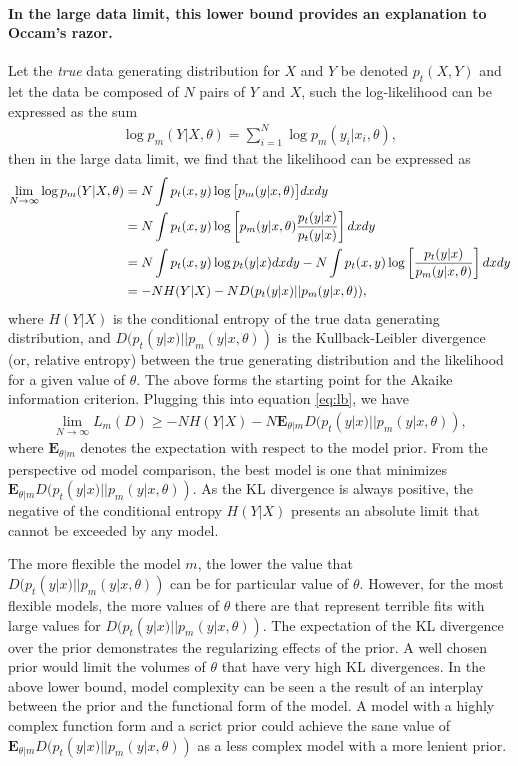 \documentclass[10pt,a4paper]{article}
\begin{document}
\paragraph{In the large data limit, this lower bound provides an explanation to Occam's razor.} Let the \emph{true} data generating distribution for $X$ and $Y$ be denoted $p_t(X,Y)$ and let the data be composed of $N$ pairs of $Y$ and $X$, such the log-likelihood can be expressed as the sum
\begin{align}
\log p_m(Y|X,\theta)=  \sum^N_{i=1} \log p_m(y_i|x_i,\theta),
\end{align}
then in the large data limit, we find that the likelihood can be expressed as
\begin{align}
\lim_{N \rightarrow \infty} \log p_m(Y|X,\theta) &= N \int p_t(x, y)  \log \big[p_m(y|x,\theta) \big]dx dy \notag\\
&=N \int p_t(x, y)  \log \left[ p_m(y|x,\theta) \frac{p_t(y|x)}{p_t(y|x)} \right] dx dy  \notag\\
&= N  \int p_t(x, y)  \log p_t(y|x) dx dy -N  \int p_t(x, y)  \log \left[  \frac{p_t(y|x)}{p_m(y|x,\theta)} \right] dx dy \notag\\
&= -N H(Y|X) - N D(p_t(y|x) || p_m(y|x,\theta)) ,
\label{eq:asym_like}
\end{align}
where $H(Y|X)$ is the conditional entropy of the true data generating distribution, and $D(p_t(y|x) || p_m(y|x,\theta))$ is the Kullback-Leibler divergence (or, relative entropy) between the true generating distribution and the likelihood for a given value of $\theta$. The above forms the starting point for the Akaike information criterion. Plugging this into equation \ref{eq:lb}, we have
\begin{align}
\lim_{N \rightarrow \infty} L_m(D)  \geq -N H(Y|X) - N \mathbf{E}_{\theta|m} D(p_t(y|x) || p_m(y|x,\theta)),
\end{align}
where $ \mathbf{E}_{\theta|m}$ denotes the expectation with respect to the model prior. From the perspective od model comparison, the best model is one that minimizes $ \mathbf{E}_{\theta|m} D(p_t(y|x) || p_m(y|x,\theta))$. As the KL divergence is always positive, the negative of the conditional entropy $H(Y|X)$ presents an absolute limit that cannot be exceeded by any model. 

The more flexible the model $m$, the lower the value that $D(p_t(y|x) || p_m(y|x,\theta))$ can be for particular value of $\theta$. However, for the most flexible models, the more values of $\theta$ there are that represent terrible fits with large values for $D(p_t(y|x) || p_m(y|x,\theta))$. The expectation of the KL divergence over the prior demonstrates the regularizing effects of the prior. A well chosen prior would limit the volumes of $\theta$ that have very high KL divergences. In the above lower bound, model complexity can be seen a the result of an interplay between the prior and the functional form of the model. A model with a highly complex function form and a scrict prior could achieve the sane value of $\mathbf{E}_{\theta|m} D(p_t(y|x) || p_m(y|x,\theta))$ as a less complex model with a more lenient prior. 
\end{document}
